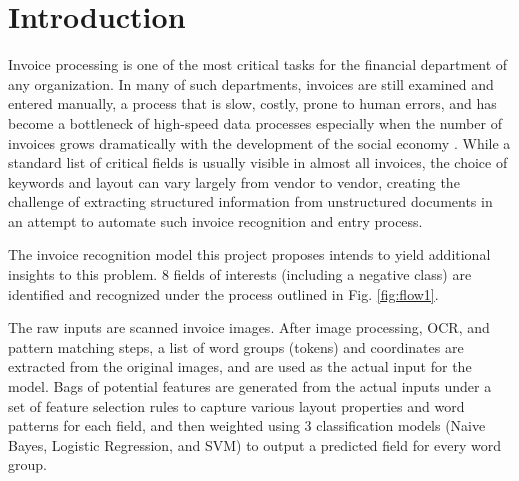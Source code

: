 \section{Introduction}
Invoice processing is one of the most critical tasks for the financial department of any organization. In many of such departments, invoices are still examined and entered manually, a process that is slow, costly, prone to human errors, and has become a bottleneck of high-speed data processes especially when the number of invoices grows dramatically with the development of the social economy \cite{ming2003research}. While a standard list of critical fields is usually visible in almost all invoices, the choice of keywords and layout can vary largely from vendor to vendor, creating the challenge of extracting structured information from unstructured documents in an attempt to automate such invoice recognition and entry process.

The invoice recognition model this project proposes intends to yield additional insights to this problem. 8 fields of interests (including a negative class) are identified and recognized under the process outlined in Fig. \ref{fig:flow1}. 

The raw inputs are scanned invoice images. After image processing, OCR, and pattern matching steps, a list of word groups (tokens) and coordinates are extracted from the original images, and are used as the actual input for the model. Bags of potential features are generated from the actual inputs under a set of feature selection rules to capture various layout properties and word patterns for each field, and then weighted using 3 classification models (Naive Bayes, Logistic Regression, and SVM) to output a predicted field for every word group.

